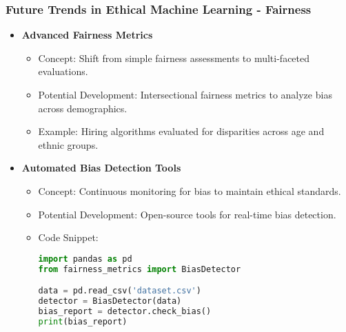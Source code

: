 \documentclass[aspectratio=169]{beamer}
\begin{document}
\begin{frame}[fragile]
    \frametitle{Future Trends in Ethical Machine Learning - Fairness}
    \begin{itemize}
        \item \textbf{Advanced Fairness Metrics}
        \begin{itemize}
            \item Concept: Shift from simple fairness assessments to multi-faceted evaluations.
            \item Potential Development: Intersectional fairness metrics to analyze bias across demographics.
            \item Example: Hiring algorithms evaluated for disparities across age and ethnic groups.
        \end{itemize}

        \item \textbf{Automated Bias Detection Tools}
        \begin{itemize}
            \item Concept: Continuous monitoring for bias to maintain ethical standards.
            \item Potential Development: Open-source tools for real-time bias detection.
            \item Code Snippet:
            \begin{lstlisting}[language=Python]
import pandas as pd
from fairness_metrics import BiasDetector

data = pd.read_csv('dataset.csv')
detector = BiasDetector(data)
bias_report = detector.check_bias()
print(bias_report)
            \end{lstlisting}
        \end{itemize}
    \end{itemize}
\end{frame}
\end{document}
